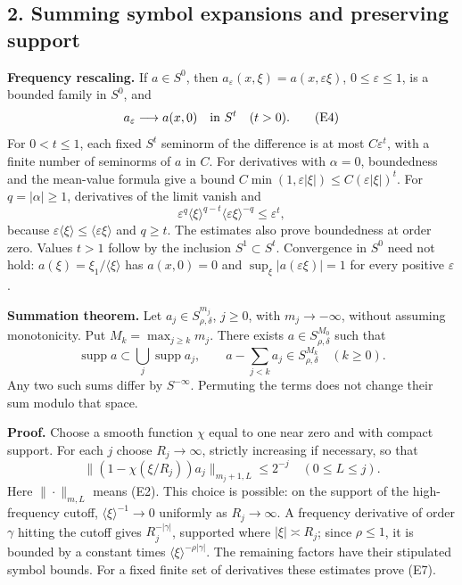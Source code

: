 \documentclass[
  11pt,
]{article}
\begin{document}
\subsection{2. Summing symbol expansions and preserving
support}\label{summing-symbol-expansions-and-preserving-support}

\textbf{Frequency rescaling.} If \(a\in S^0\), then
\(a_\varepsilon(x,\xi)=a(x,\varepsilon\xi)\), \(0\leq\varepsilon\leq1\),
is a bounded family in \(S^0\), and \[
a_\varepsilon\longrightarrow a(x,0)\quad\hbox{in }S^t
\quad(t>0).
\tag{E4}
\] For \(0<t\leq1\), each fixed \(S^t\) seminorm of the difference is at
most \(C\varepsilon^t\), with a finite number of seminorms of \(a\) in
\(C\). For derivatives with \(\alpha=0\), boundedness and the mean-value
formula give a bound
\(C\min(1,\varepsilon|\xi|)\leq C(\varepsilon|\xi|)^t\). For
\(q=|\alpha|\geq1\), derivatives of the limit vanish and \[
\varepsilon^q\langle\xi\rangle^{q-t}
\langle\varepsilon\xi\rangle^{-q}\leq\varepsilon^t,
\tag{E5}
\] because
\(\varepsilon\langle\xi\rangle\leq\langle\varepsilon\xi\rangle\) and
\(q\geq t\). The estimates also prove boundedness at order zero. Values
\(t>1\) follow by the inclusion \(S^1\subset S^t\). Convergence in
\(S^0\) need not hold: \(a(\xi)=\xi_1/\langle\xi\rangle\) has
\(a(x,0)=0\) and \(\sup_\xi|a(\varepsilon\xi)|=1\) for every positive
\(\varepsilon\).

\textbf{Summation theorem.} Let \(a_j\in S^{m_j}_{\rho,\delta}\),
\(j\geq0\), with \(m_j\to-\infty\), without assuming monotonicity. Put
\(M_k=\max_{j\geq k}m_j\). There exists \(a\in S^{M_0}_{\rho,\delta}\)
such that \[
\operatorname{supp}a\subset\bigcup_j\operatorname{supp}a_j,
\qquad a-\sum_{j<k}a_j\in S^{M_k}_{\rho,\delta}\quad(k\geq0).
\tag{E6}
\] Any two such sums differ by \(S^{-\infty}\). Permuting the terms does
not change their sum modulo that space.

\textbf{Proof.} Choose a smooth function \(\chi\) equal to one near zero
and with compact support. For each \(j\) choose \(R_j\to\infty\),
strictly increasing if necessary, so that \[
\|(1-\chi(\xi/R_j))a_j\|_{m_j+1,L}\leq2^{-j}
\quad(0\leq L\leq j).
\tag{E7}
\] Here \(\|\cdot\|_{m,L}\) means (E2). This choice is possible: on the
support of the high-frequency cutoff, \(\langle\xi\rangle^{-1}\to0\)
uniformly as \(R_j\to\infty\). A frequency derivative of order
\(\gamma\) hitting the cutoff gives \(R_j^{-|\gamma|}\), supported where
\(|\xi|\asymp R_j\); since \(\rho\leq1\), it is bounded by a constant
times \(\langle\xi\rangle^{-\rho|\gamma|}\). The remaining factors have
their stipulated symbol bounds. For a fixed finite set of derivatives
these estimates prove (E7).
\end{document}
